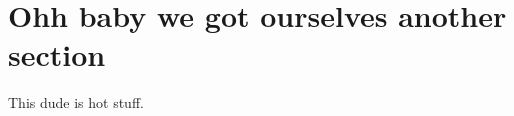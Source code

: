 \documentclass[../../main.tex]{subfiles}
\begin{document}
\section{Ohh baby we got ourselves another section}

This dude is hot stuff\autocite{Nam1967}.

\onlyinsubfile{\printbibliography}
\end{document}
